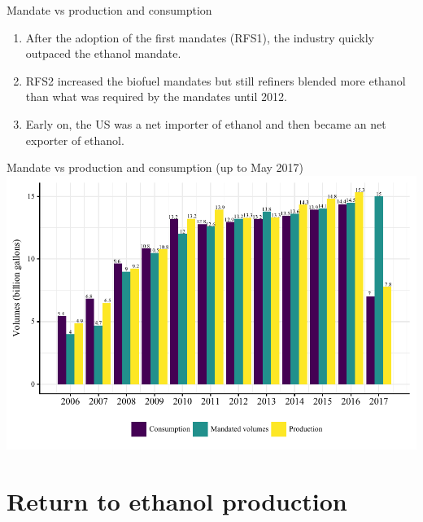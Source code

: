 \documentclass[table,xcolor=pdftex,dvipsnames]{beamer}\usepackage[]{graphicx}\usepackage[]{color}
\makeatletter
\def\maxwidth{ %
  \ifdim\Gin@nat@width>\linewidth
    \linewidth
  \else
    \Gin@nat@width
  \fi
}
\newenvironment{knitrout}{}{} %
\makeatother
\begin{document}

\begin{frame}{Mandate vs production and consumption}
\begin{enumerate}[label=\textbullet]
    \item After the adoption of the first mandates (RFS1), the industry quickly outpaced the ethanol mandate.
    \item RFS2 increased the biofuel mandates but still refiners blended more ethanol than what was required by the mandates until 2012.
    \item Early on, the US was a net importer of ethanol and then became an net exporter of ethanol.
\end{enumerate}
\end{frame}


\begin{frame}{Mandate vs production and consumption (up to May 2017)}
\begin{knitrout}
\color{fgcolor}
\includegraphics[width=\maxwidth]{figure/figure_rfs2-1} 

\end{knitrout}
\end{frame}



\section{Return to ethanol production}
\end{document}
